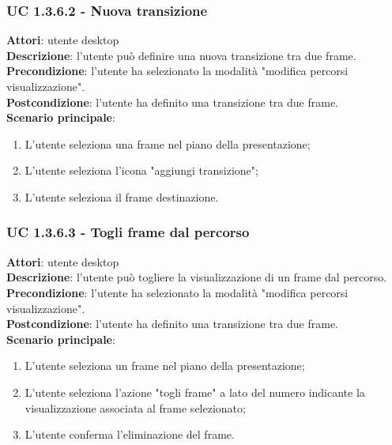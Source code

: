 \subsubsection{UC 1.3.6.2 - Nuova transizione}{
	\label{uc1.3.6.2}
	\textbf{Attori}: utente desktop \\
	\textbf{Descrizione}: l'utente può definire una nuova transizione tra due frame. \\
	\textbf{Precondizione}: l'utente ha selezionato la modalità "modifica percorsi visualizzazione".	\\
	\textbf{Postcondizione}: l'utente ha definito una transizione tra due frame.	\\
	\textbf{Scenario principale}:
	\begin{enumerate}
		\item L'utente seleziona una frame nel piano della presentazione;
		\item L'utente seleziona l'icona "aggiungi transizione";
		\item L'utente seleziona il frame destinazione.
	\end{enumerate}
}
\subsubsection{UC 1.3.6.3 - Togli frame dal percorso}{
	\label{uc1.3.6.3}
	\textbf{Attori}: utente desktop \\
	\textbf{Descrizione}: l'utente può togliere la visualizzazione di un frame dal percorso. \\
	\textbf{Precondizione}: l'utente ha selezionato la modalità "modifica percorsi visualizzazione".	\\
	\textbf{Postcondizione}: l'utente ha definito una transizione tra due frame.	\\
	\textbf{Scenario principale}:
	\begin{enumerate}
		\item L'utente seleziona un frame nel piano della presentazione;
		\item L'utente seleziona l'azione "togli frame" a lato del numero indicante la visualizzazione associata al frame selezionato;
		\item L'utente conferma l'eliminazione del frame.
	\end{enumerate}
}
